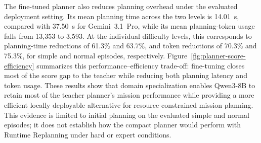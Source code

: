 The fine-tuned planner also reduces planning overhead under the evaluated
deployment setting. Its mean planning time across the two levels is 14.01~s,
compared with 37.50~s for Gemini~3.1~Pro, while its mean planning-token usage
falls from 13,353 to 3,593. At the individual difficulty levels, this
corresponds to planning-time reductions of 61.3\% and 63.7\%, and token
reductions of 70.3\% and 75.3\%, for simple and normal episodes,
respectively. Figure~\ref{fig:planner-score-efficiency} summarizes this
performance--efficiency trade-off: fine-tuning closes most of the score gap to
the teacher while reducing both planning latency and token usage. These results
show that domain specialization enables Qwen3-8B to retain most of the teacher
planner's mission performance while providing a more efficient locally
deployable alternative for resource-constrained mission planning. This evidence
is limited to initial planning on the evaluated simple and normal episodes; it
does not establish how the compact planner would perform with Runtime
Replanning under hard or expert conditions.

\FloatBarrier

\endinput
